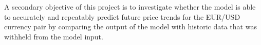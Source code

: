 \documentclass[11pt]{informatics-report}
\begin{document}
A secondary objective of this project is to investigate whether the model is able to accurately and repeatably predict future price trends for the EUR/USD currency pair by comparing the output of the model with historic data that was withheld from the model input.





%

%
%
%
%



\appendix
%
%
%
\end{document}
